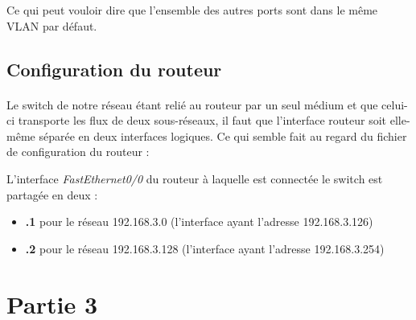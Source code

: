 \documentclass[12pt,a4paper,notitlepage]{article}
\begin{document}
Ce qui peut vouloir dire que l'ensemble des autres ports sont dans le même VLAN par défaut.

\subsection{Configuration du routeur}
\paragraph{}Le switch de notre réseau étant relié au routeur par un seul médium et que celui-ci transporte les flux de deux sous-réseaux, il faut que l'interface routeur soit elle-même séparée en deux interfaces logiques. Ce qui semble fait au regard du fichier de configuration du routeur :


\begin{center}
 \end{center}



L'interface \textit{FastEthernet0/0} du routeur à laquelle est connectée le switch est partagée en deux : 
\begin{itemize}
\item \textbf{.1} pour le réseau 192.168.3.0 (l'interface ayant l'adresse 192.168.3.126)
\item \textbf{.2 }pour le réseau 192.168.3.128 (l'interface ayant l'adresse 192.168.3.254)
\end{itemize}


\section{Partie 3}
\end{document}
